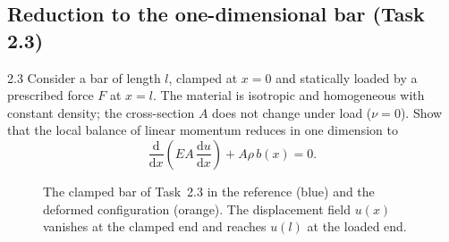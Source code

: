 \documentclass[11pt,a4paper]{article}
\numberwithin{equation}{section}
\theoremstyle{remark}
\begin{document}
\subsection{Reduction to the one-dimensional bar (Task 2.3)}\label{sec:bar}

\begin{task}{2.3}
  Consider a bar of length $l$, clamped at $x=0$ and statically loaded by a prescribed
  force $F$ at $x=l$. The material is isotropic and homogeneous with constant density; the
  cross-section $A$ does not change under load ($\nu = 0$). Show that the local balance of
  linear momentum reduces in one dimension to
  \begin{equation*}
    \frac{\mathrm{d}}{\mathrm{d}x}\!\left(EA\,\frac{\mathrm{d}u}{\mathrm{d}x}\right) + A\rho\,b(x) = 0.
  \end{equation*}
\end{task}

\begin{figure}[ht]
  \centering
  \caption{The clamped bar of Task~2.3 in the reference (blue) and the deformed
    configuration (orange). The displacement field $u(x)$ vanishes at the clamped end and
    reaches $u(l)$ at the loaded end.}
  \label{fig:bar}
\end{figure}
\end{document}
